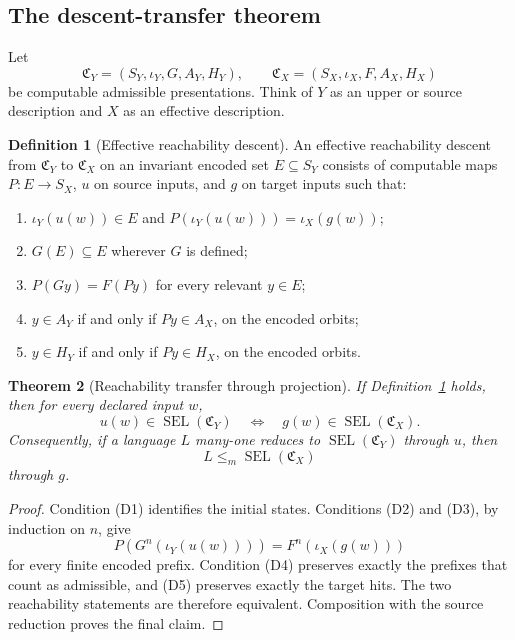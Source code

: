 \documentclass[11pt]{article}
\newtheorem{theorem}{Theorem}[section]
\theoremstyle{definition}
\newtheorem{definition}[theorem]{Definition}
\theoremstyle{remark}
\newcommand{\SEL}{\operatorname{SEL}}
\begin{document}
\subsection{The descent-transfer theorem}

Let
\[
\mathfrak C_Y=(S_Y,\iota_Y,G,A_Y,H_Y),
\qquad
\mathfrak C_X=(S_X,\iota_X,F,A_X,H_X)
\]
be computable admissible presentations.  Think of \(Y\) as an upper or source
description and \(X\) as an effective description.

\begin{definition}[Effective reachability descent]\label{def:descent}
An effective reachability descent from \(\mathfrak C_Y\) to
\(\mathfrak C_X\) on an invariant encoded set \(E\subseteq S_Y\) consists of
computable maps \(P:E\to S_X\), \(u\) on source inputs, and \(g\) on target
inputs such that:
\begin{enumerate}[label=(D\arabic*)]
\item \(\iota_Y(u(w))\in E\) and
\(P(\iota_Y(u(w)))=\iota_X(g(w))\);
\item \(G(E)\subseteq E\) wherever \(G\) is defined;
\item \(P(Gy)=F(Py)\) for every relevant \(y\in E\);
\item \(y\in A_Y\) if and only if \(Py\in A_X\), on the encoded orbits;
\item \(y\in H_Y\) if and only if \(Py\in H_X\), on the encoded orbits.
\end{enumerate}
\end{definition}

\begin{theorem}[Reachability transfer through projection]\label{thm:transfer}
If Definition~\ref{def:descent} holds, then for every declared input \(w\),
\[
 u(w)\in\SEL(\mathfrak C_Y)
 \quad\Longleftrightarrow\quad
 g(w)\in\SEL(\mathfrak C_X).
\]
Consequently, if a language \(L\) many-one reduces to
\(\SEL(\mathfrak C_Y)\) through \(u\), then
\[
 L\leq_m\SEL(\mathfrak C_X)
\]
through \(g\).
\end{theorem}

\begin{proof}
Condition (D1) identifies the initial states.  Conditions (D2) and (D3), by
induction on \(n\), give
\[
 P\!\left(G^n(\iota_Y(u(w)))\right)
 =
 F^n(\iota_X(g(w)))
\]
for every finite encoded prefix.  Condition (D4) preserves exactly the prefixes
that count as admissible, and (D5) preserves exactly the target hits.  The two
reachability statements are therefore equivalent.  Composition with the
source reduction proves the final claim.
\end{proof}
\end{document}

